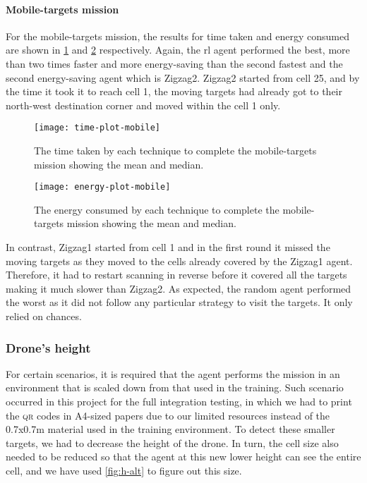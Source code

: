 \documentclass[../main.tex]{subfiles}
\begin{document}
\paragraph{Mobile-targets mission}

For the mobile-targets mission, the results for time taken and energy consumed are shown in 
\cref{fig:time-plot-mobile} and \cref{fig:energy-plot-mobile} respectively.
Again, the \gls{rl} agent performed the best, more than two times
faster and more energy-saving than the
second fastest and the second energy-saving agent which is Zigzag2.
Zigzag2 started from cell 25, and by the time it took it to reach
cell 1, the moving targets had already got to their north-west
destination corner and moved within the cell 1 only.

\begin{figure}[p]
	\centering
	\texttt{[image: time-plot-mobile]}
	\caption{The time taken by each technique
        to complete the mobile-targets mission showing the mean and
    median.}
        \label{fig:time-plot-mobile}
\end{figure}

\begin{figure}[p]
	\centering
	\texttt{[image: energy-plot-mobile]}
	\caption{The energy consumed by each technique
        to complete the mobile-targets mission showing the mean and
    median.}
        \label{fig:energy-plot-mobile}
\end{figure}

In contrast, Zigzag1 started from cell 1 and in the first round it
missed the moving targets as they moved to the cells already covered
by the Zigzag1 agent.
Therefore, it had to restart scanning in reverse before it
covered all the targets making it much slower than Zigzag2.
As expected, the random agent performed the worst as it did not follow
any particular strategy to visit the targets. It only relied on
chances.

\subsubsection{Drone's height}

For certain scenarios, it is required that the agent performs the
mission in an environment that is scaled down from that used in the
training.
Such scenario occurred in this project for the full integration
testing, in which we had to print the \textsc{qr} codes in A4-sized papers due
to our limited resources instead of the 0.7x0.7m material used in the
training environment.
To detect these smaller targets, we had to decrease the height of the
drone.
In turn, the cell size also needed to be reduced so that the agent at
this new lower height can see the entire cell, and we have used
\cref{fig:h-alt} to figure out this size.
\end{document}
